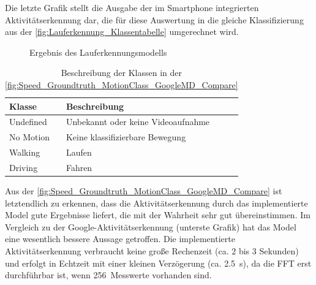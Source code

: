 Die letzte Grafik stellt die Ausgabe der im Smartphone integrierten Aktivitäts\-erkenn\-ung dar, die für diese Auswertung in die gleiche Klassifizierung aus der \autoref{fig:Lauferkennung_Klassentabelle} umgerechnet wird.
	\begin{figure}[htpb]
		\centering
		\caption{Ergebnis des Lauferkennungsmodells}
		\label{fig:Speed_Groundtruth_MotionClass_GoogleMD_Compare}
	\end{figure}
\begin{table}[htpb]
	\caption{Beschreibung der Klassen in der \autoref{fig:Speed_Groundtruth_MotionClass_GoogleMD_Compare}}
	\label{fig:Lauferkennung_Klassentabelle}
	\centering
	\begin{tabular}{|l|l|}
		\hline
		\textbf{Klasse} & \textbf{Beschreibung}\\
		\hline
		Undefined & Unbekannt oder keine Videoaufnahme\\ 
		\hline
		No Motion &  Keine klassifizierbare Bewegung\\ 
		\hline
		Walking & Laufen\\ 
		\hline
		Driving & Fahren\\ 
		\hline
	\end{tabular}
\end{table}

Aus der \autoref{fig:Speed_Groundtruth_MotionClass_GoogleMD_Compare} ist letztendlich zu erkennen, dass die Aktivitäts\-erkenn\-ung durch das implementierte Model gute Ergebnisse liefert, die mit der Wahrheit sehr gut übereinstimmen. Im Vergleich zu der Google-Aktivitäts\-erkenn\-ung (unterste Grafik) hat das Model eine wesentlich bessere Aussage getroffen. Die implementierte Aktivitätserkennung verbraucht keine große Rechenzeit (ca. $2$ bis $3$ Sekunden) und erfolgt in Echtzeit mit einer kleinen Verzögerung (ca. \SI{2,5}{\second}), da die FFT erst durchführbar ist, wenn \SI{256}{Messwerte} vorhanden sind.



